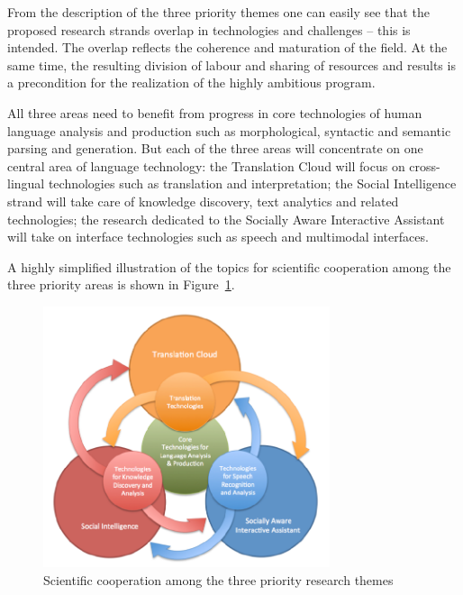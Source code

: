 \documentclass[10pt, plain]{../../metanetpaper}
\begin{document}
\begin{multicols}{2}
From the description of the three priority themes one can easily see that the proposed research strands overlap in technologies and challenges -- this is intended. The overlap reflects the coherence and maturation of the field. At the same time, the resulting division of labour and sharing of resources and results is a precondition for the realization of the highly ambitious program.
 
All three areas need to benefit from progress in core technologies of human language analysis and production such as morphological, syntactic and semantic parsing and generation. But each of the three areas will concentrate on one central area of language technology: the Translation Cloud will focus on cross-lingual technologies such as translation and interpretation; the Social Intelligence strand will take care of knowledge discovery, text analytics and related technologies; the research dedicated to the Socially Aware Interactive Assistant will take on interface technologies such as speech and multimodal interfaces.
 
A highly simplified illustration of the topics for scientific cooperation among the three priority areas is shown in Figure~\ref{fig:priority-themes}.

\begin{figure}[htb]
  \center
  \includegraphics[width=0.75\textwidth]{../_media/PT-Rings}
  \caption{Scientific cooperation among the three priority research themes}
  \label{fig:priority-themes}
\end{figure}


\end{multicols}
\end{document}
